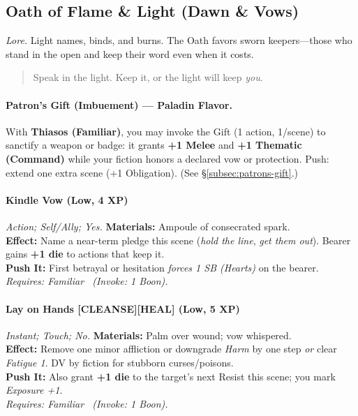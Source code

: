 \subsection{Oath of Flame \& Light (Dawn \& Vows)}
\textit{Lore.} Light names, binds, and burns. The Oath favors sworn keepers—those who stand in the open and keep their word even when it costs.

\begin{quote}
Speak in the light. Keep it, or the light will keep \emph{you}.
\end{quote}

\paragraph*{Patron’s Gift (Imbuement) — Paladin Flavor.}
With \textbf{Thiasos (Familiar)}, you may invoke the Gift (1 action, 1/scene) to sanctify a weapon or badge: it grants \textbf{+1 Melee} and \textbf{+1 Thematic (Command)} while your fiction honors a declared vow or protection. Push: extend one extra scene (+1 Obligation). (See \S\ref{subsec:patrons-gift}.)

\paragraph{Kindle Vow (Low, 4 XP)} \emph{Action; Self/Ally; Yes.}
\textbf{Materials:} Ampoule of consecrated spark.\\
\textbf{Effect:} Name a near-term pledge this scene (\emph{hold the line}, \emph{get them out}). Bearer gains \textbf{+1 die} to actions that keep it.\\
\textbf{Push It:} First betrayal or hesitation \emph{forces 1 SB (Hearts)} on the bearer.\\
\emph{Requires: Familiar \ (\textit{Invoke:} 1 Boon).}

\paragraph{Lay on Hands \textnormal{[CLEANSE][HEAL]} (Low, 5 XP)} \emph{Instant; Touch; No.}
\textbf{Materials:} Palm over wound; vow whispered.\\
\textbf{Effect:} Remove one minor affliction or downgrade \emph{Harm} by one step \emph{or} clear \emph{Fatigue 1}. DV by fiction for stubborn curses/poisons.\\
\textbf{Push It:} Also grant \textbf{+1 die} to the target’s next Resist this scene; you mark \emph{Exposure +1}.\\
\emph{Requires: Familiar \ (\textit{Invoke:} 1 Boon).}

